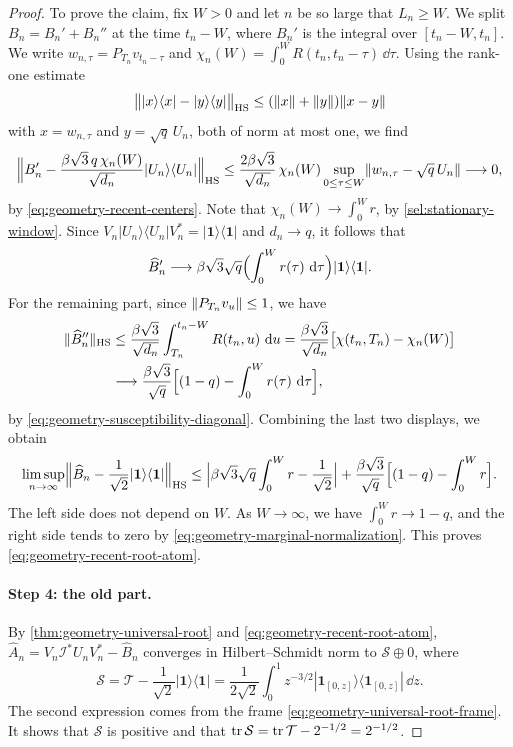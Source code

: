 \begin{proof}
To prove the claim, fix $W>0$ and let $n$ be so large that $L_n\ge W$. We split $B_n=B_n'+B_n''$ at the time $t_n-W$, where $B_n'$ is the integral over $[t_n-W,t_n]$. We write $w_{n,\tau}=P_{T_n}v_{t_n-\tau}$ and $\chi_n(W)=\int_0^WR(t_n,t_n-\tau)\,\dd\tau$. Using the rank-one estimate
\[
 \bigl\||x\rangle\langle x|-|y\rangle\langle y|\bigr\|_{\mathrm{HS}}\le(\lVert x\rVert+\lVert y\rVert)\lVert x-y\rVert
\]
with $x=w_{n,\tau}$ and $y=\sqrt q\,U_n$, both of norm at most one, we find
\[
 \Bigl\|B_n'-\frac{\beta\sqrt3\,q\,\chi_n(W)}{\sqrt{d_n}}|U_n\rangle\langle U_n|\Bigr\|_{\mathrm{HS}}
 \le\frac{2\beta\sqrt3}{\sqrt{d_n}}\,\chi_n(W)\sup_{0\le\tau\le W}\lVert w_{n,\tau}-\sqrt q\,U_n\rVert\longrightarrow0,
\]
by \eqref{eq:geometry-recent-centers}. Note that $\chi_n(W)\to\int_0^Wr$, by \eqref{sel:stationary-window}. Since $V_n|U_n\rangle\langle U_n|V_n^*=|\mathbf1\rangle\langle\mathbf1|$ and $d_n\to q$, it follows that
\[
 \widehat B_n'\longrightarrow\beta\sqrt3\sqrt q\Bigl(\int_0^Wr(\tau)\,\mathop{}\!\mathrm d\tau\Bigr)|\mathbf1\rangle\langle\mathbf1| .
\]
For the remaining part, since $\lVert P_{T_n}v_u\rVert\le1$, we have
\begin{align*}
 \lVert\widehat B_n''\rVert_{\mathrm{HS}}&\le\frac{\beta\sqrt3}{\sqrt{d_n}}\int_{T_n}^{t_n-W}R(t_n,u)\,\mathop{}\!\mathrm d u
 =\frac{\beta\sqrt3}{\sqrt{d_n}}\bigl[\chi(t_n,T_n)-\chi_n(W)\bigr]\\
 &\longrightarrow\frac{\beta\sqrt3}{\sqrt q}\Bigl[(1-q)-\int_0^Wr(\tau)\,\mathop{}\!\mathrm d\tau\Bigr],
\end{align*}
by \eqref{eq:geometry-susceptibility-diagonal}. Combining the last two displays, we obtain
\[
 \limsup_{n\to\infty}\Bigl\|\widehat B_n-\frac1{\sqrt2}|\mathbf1\rangle\langle\mathbf1|\Bigr\|_{\mathrm{HS}}
 \le\Bigl|\beta\sqrt3\sqrt q\int_0^Wr-\frac1{\sqrt2}\Bigr|+\frac{\beta\sqrt3}{\sqrt q}\Bigl[(1-q)-\int_0^Wr\Bigr].
\]
The left side does not depend on $W$. As $W\to\infty$, we have $\int_0^Wr\to1-q$, and the right side tends to zero by \eqref{eq:geometry-marginal-normalization}. This proves \eqref{eq:geometry-recent-root-atom}.

\paragraph{Step 4: the old part.}
By \cref{thm:geometry-universal-root} and \eqref{eq:geometry-recent-root-atom}, $\widehat A_n=V_n\mathcal I^*U_nV_n^*-\widehat B_n$ converges in Hilbert--Schmidt norm to $\mathcal S\oplus0$, where
\[
 \mathcal S=\mathcal T-\frac1{\sqrt2}|\mathbf1\rangle\langle\mathbf1|
 =\frac1{2\sqrt2}\int_0^1z^{-3/2}|\mathbf1_{[0,z]}\rangle\langle\mathbf1_{[0,z]}|\,\dd z .
\]
The second expression comes from the frame \eqref{eq:geometry-universal-root-frame}. It shows that $\mathcal S$ is positive and that $\operatorname{tr}\mathcal S=\operatorname{tr}\mathcal T-2^{-1/2}=2^{-1/2}$.


\end{proof}
